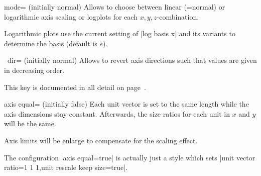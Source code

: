 \begin{pgfplotsxykey}{\x mode= (initially normal)}
	Allows to choose between linear (=normal) or logarithmic axis scaling or logplots for each $x,y,z$-combination.

	Logarithmic plots use the current setting of |log basis x| and its variants to determine the basis (default is $e$).
\end{pgfplotsxykey}

{\def\pgfmanualpdflabel#1#2{}
\begin{pgfplotsxykey}{\x\ dir= (initially normal)}
	Allows to revert axis directions such that values are given in decreasing order.

	This key is documented in all detail on page~\pageref{key:pgfplots:xydir}.
\end{pgfplotsxykey}
}

\begin{pgfplotskey}{axis equal= (initially false)}
	Each unit vector is set to the same length while the axis dimensions stay constant. Afterwards, the size ratios for each unit in $x$ and $y$ will be the same.
	
	Axis limits will be enlarge to compensate for the scaling effect.
\begin{codeexample}[]
\hspace{1cm}
\end{codeexample}
	
\begin{codeexample}[]
\hspace{1cm}
\end{codeexample}

	The configuration |axis equal=true| is actually just a style which sets |unit vector ratio=1 1 1,unit rescale keep size=true|.
\end{pgfplotskey}

